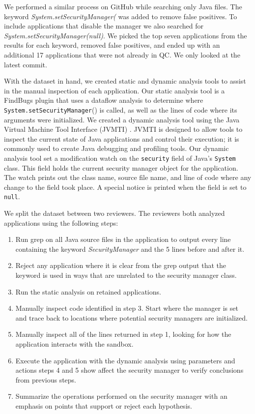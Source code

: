 \documentclass{sig-alternate}
\begin{document}
We performed a similar process on GitHub while searching only Java files. The keyword \textit{System.setSecurityManager(} was added to remove false positives. To include applications that disable the manager we also searched for \textit{System.setSecurityManager(null)}. We picked the top seven applications from the results for each keyword, removed false positives, and ended up with an additional 17 applications that were not already in QC. We only looked at the latest commit.

With the dataset in hand, we created static and dynamic analysis tools
to assist in the manual inspection of each application. Our static
analysis tool is a FindBugs \cite{hovemeyer_finding_2004} plugin
that uses a dataflow analysis to determine where \texttt{System.setSecurityManager}()
is called, as well as the lines of code where its arguments were initialized.
We created a dynamic analysis tool using the Java Virtual Machine
Tool Interface (JVMTI) \cite{_jvmti}. JVMTI is designed to allow
tools to inspect the current state of Java applications and control
their execution; it is commonly used to create Java debugging and
profiling tools. Our dynamic analysis tool set a modification watch
on the \texttt{security} field of Java's \texttt{System} class. This
field holds the current security manager object for the application.
The watch prints out the class name, source file name, and line of
code where any change to the field took place. A special notice is
printed when the field is set to \texttt{null}. 

We split the dataset between two reviewers. The reviewers both analyzed
applications using the following steps:

\begin{enumerate}
\item Run grep on all Java source files in the application
to output every line containing the keyword \textsl{SecurityManager} and the 5 lines before and after it.
\item Reject any application where it is clear from the grep output that the keyword is used in ways that are unrelated to the security manager class.
\item Run the static analysis on retained applications. 
\item Manually inspect code identified in step 3.
Start where the manager is set and trace 
back to locations where potential security
managers are initialized. 
\item Manually inspect all of the lines returned in step 1, looking for how the application interacts with
the sandbox. 
\item Execute the application with the dynamic analysis using parameters
and actions steps 4 and 5 show affect the security
manager to verify conclusions from previous steps.
\item Summarize the operations performed
on the security manager with an emphasis on points that support or
reject each hypothesis.
\end{enumerate}
\end{document}
